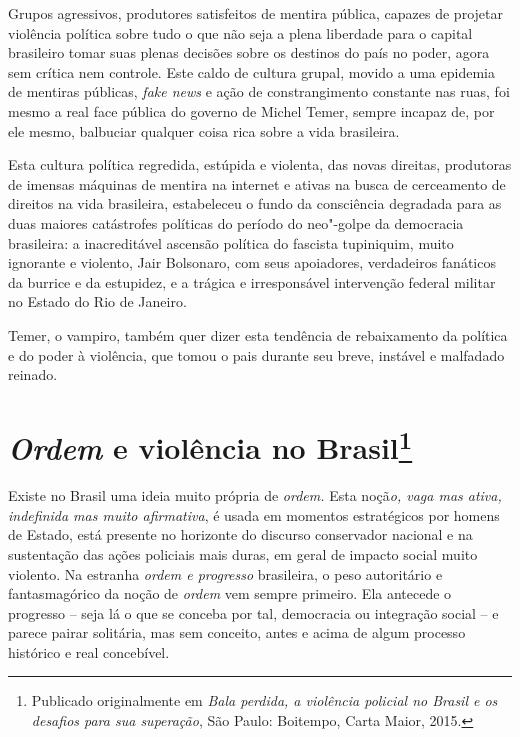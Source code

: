 Grupos agressivos, produtores satisfeitos de mentira pública, capazes de
projetar violência política sobre tudo o que não seja a plena liberdade
para o capital brasileiro tomar suas plenas decisões sobre os destinos
do país no poder, agora sem crítica nem controle. Este caldo de cultura
grupal, movido a uma epidemia de mentiras públicas, \emph{fake news} e
ação de constrangimento constante nas ruas, foi mesmo a real face
pública do governo de Michel Temer, sempre incapaz de, por ele mesmo,
balbuciar qualquer coisa rica sobre a vida brasileira.

Esta cultura política regredida, estúpida e violenta, das novas
direitas, produtoras de imensas máquinas de mentira na internet e ativas
na busca de cerceamento de direitos na vida brasileira, estabeleceu o
fundo da consciência degradada para as duas maiores catástrofes
políticas do período do neo"-golpe da democracia brasileira: a
inacreditável ascensão política do fascista tupiniquim, muito ignorante
e violento, Jair Bolsonaro, com seus apoiadores, verdadeiros fanáticos
da burrice e da estupidez, e a trágica e irresponsável intervenção
federal militar no Estado do Rio de Janeiro.

Temer, o vampiro, também quer dizer esta tendência de rebaixamento da
política e do poder à violência, que tomou o pais durante seu breve,
instável e malfadado reinado.

\chapter{\emph{Ordem} e violência no Brasil\footnote{Publicado
  originalmente em \emph{Bala perdida, a violência policial no Brasil e
  os desafios para sua superação}, São Paulo: Boitempo, Carta Maior,
  2015.}}

Existe no Brasil uma ideia muito própria de \emph{ordem.} Esta
noçã\emph{o, vaga mas ativa, indefinida mas muito afirmativa}, é usada
em momentos estratégicos por homens de Estado, está presente no
horizonte do discurso conservador nacional e na sustentação das ações
policiais mais duras, em geral de impacto social muito violento. Na
estranha \emph{ordem e progresso} brasileira, o peso autoritário e
fantasmagórico da noção de \emph{ordem} vem sempre primeiro. Ela
antecede o progresso -- seja lá o que se conceba por tal, democracia ou
integração social -- e parece pairar solitária, mas sem conceito, antes
e acima de algum processo histórico e real concebível.


